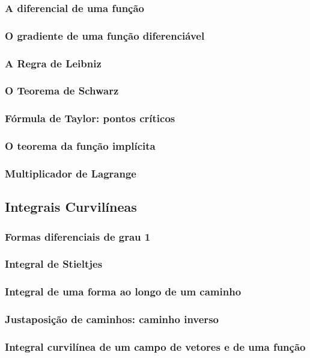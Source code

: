 \documentclass{article}
\theoremstyle{theorem}
\theoremstyle{lemma}
\theoremstyle{definition}
\theoremstyle{remark}
\begin{document}
   \subsubsection{A diferencial de uma função}
   \subsubsection{O gradiente de uma função diferenciável}
   \subsubsection{A Regra de Leibniz}
   \subsubsection{O Teorema de Schwarz}
   \subsubsection{Fórmula de Taylor: pontos críticos}
   \subsubsection{O teorema da função implícita}
   \subsubsection{ Multiplicador de Lagrange}
\subsection{ Integrais Curvilíneas}
   \subsubsection{Formas diferenciais de grau 1}
   \subsubsection{Integral de Stieltjes}
   \subsubsection{Integral de uma forma ao longo de um caminho}
   \subsubsection{Justaposição de caminhos: caminho inverso}
   \subsubsection{Integral curvilínea de um campo de vetores e de uma função}
\end{document}
